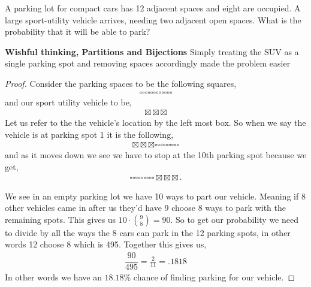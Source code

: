 \documentclass[11pt]{article}
\newenvironment{problem}[2][Problem\!]{\begin{trivlist}
\item[\hskip \labelsep {\bfseries #1}\hskip \labelsep {\bfseries #2}]}{\end{trivlist}}
\begin{document}
\begin{tcolorbox}
    \begin{problem} {OC | 11/01 | 69.}
        A parking lot for compact cars has 12 adjacent spaces and eight are occupied. A large sport-utility vehicle arrives, needing two adjacent open spaces. What is the probability that it will be able to park?
    \end{problem}
    \textbf{Wishful thinking, Partitions and Bijections} Simply treating the SUV as a single parking spot and removing spaces accordingly made the problem easier
\end{tcolorbox}
\begin{proof}
    Consider the parking spaces to be the following squares, 
    \begin{align*}
        \square \square \square \square \square \square \square \square \square \square \square \square
    \end{align*}
    and our sport utility vehicle to be,
    \begin{align*}
        \boxtimes \boxtimes \boxtimes 
    \end{align*}
    Let us refer to the the vehicle's location by the left most box. So when we say the vehicle is at parking spot 1 it is the following,
    \begin{align*}
        \boxtimes \boxtimes \boxtimes \square \square \square \square \square \square \square \square \square
    \end{align*}
    and as it moves down we see we have to stop at the 10th parking spot because we get,
    \begin{align*}
        \square \square \square \square \square \square \square \square \square \boxtimes \boxtimes \boxtimes.
    \end{align*}

    We see in an empty parking lot we have 10 ways to part our vehicle. Meaning if 8 other vehicles came in after us they'd have 9 choose 8 ways to park with the remaining spots. This gives us $10 \cdot \binom{9}{8} = 90 $. So to get our probability we need to divide by all the ways the 8 cars can park in the 12 parking spots, in other words 12 choose 8 which is 495. Together this gives us,
    \begin{align*}
        \dfrac{90}{495} = \frac{2}{11} = .1818
    \end{align*}
    In other words we have an $18.18\%$ chance of finding parking for our vehicle. 
\end{proof}
\end{document}

